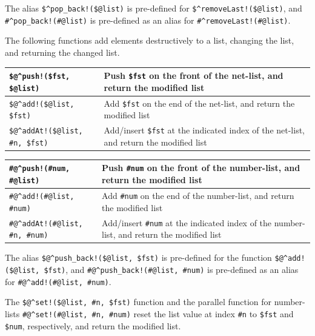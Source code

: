 \documentclass[letterpaper,12pt]{article}
\begin{document}
\vspace{.5cm}

The alias \verb+$^pop_back!($@list)+ is pre-defined for
\verb+$^removeLast!($@list)+, and  \verb+#^pop_back!(#@list)+ is
pre-defined as an alias for \verb+#^removeLast!(#@list)+.

The following functions add elements destructively to a list, changing
the list, and returning the changed list.

\vspace{.5cm}

\noindent
\begin{tabular}{|l|p{6.5cm}|}
\hline
\verb+$@^push!($fst, $@list)+ & Push \verb!$fst! on the front of the net-list, and return the
modified list\\
\hline
\verb+$@^add!($@list, $fst)+ & Add \verb!$fst! on the end of the net-list, and return the modified
list\\
\hline
\verb+$@^addAt!($@list, #n, $fst)+ & Add/insert \verb!$fst! at the indicated index of
the net-list, and return the
modified list\\
\hline
\end{tabular}

\vspace{.5cm}

\noindent
\begin{tabular}{|l|p{6.5cm}|}
\hline
\verb+#@^push!(#num, #@list)+ & Push \verb!#num! on the front of the number-list, and return the
modified list\\
\hline
\verb+#@^add!(#@list, #num)+ & Add \verb!#num! on the end of the number-list, and return the modified
list\\
\hline
\verb+#@^addAt!(#@list, #n, #num)+ & Add/insert \verb!#num! at the indicated index of
the number-list, and return the
modified list\\
\hline
\end{tabular}

\vspace{.5cm}

The alias \verb+$@^push_back!($@list, $fst)+ is pre-defined for the function
\verb+$@^add!($@list, $fst)+, and \verb+#@^push_back!(#@list, #num)+ is pre-defined as an
alias for \verb+#@^add!(#@list, #num)+.

The \verb+$@^set!($@list, #n, $fst)+ function and the parallel function for
number-lists
\verb+#@^set!(#@list, #n, #num)+ reset the list value at index
\verb!#n! to \verb!$fst! and \verb!$num!, respectively, and return the modified list.
\end{document}
